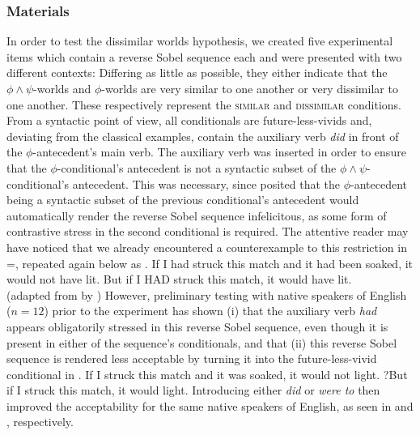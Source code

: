 \subsubsection{Materials}
In order to test the dissimilar worlds hypothesis, we created five experimental items which contain a reverse Sobel sequence each and were presented with two different contexts: Differing as little as possible, they either indicate that the $\phi\land\psi$-worlds and $\phi$-worlds are very similar to one another or very dissimilar to one another. These respectively represent the {\scshape similar} and {\scshape dissimilar} conditions. From a syntactic point of view, all conditionals are future-less-vivids and, deviating from the classical examples, contain the auxiliary verb \textit{did} in front of the $\phi$-antecedent's main verb. The auxiliary verb was inserted in order to ensure that the $\phi$-conditional's antecedent is not a syntactic subset of the $\phi\land\psi$-conditional's antecedent. This was necessary, since \textcite[p. 135]{Klecha2015} posited that the $\phi$-antecedent being a syntactic subset of the previous conditional's antecedent would automatically render the reverse Sobel sequence infelicitous, as some form of contrastive stress in the second conditional is required. The attentive reader may have noticed that we already encountered a counterexample to this restriction in =, repeated again below as . 
\ex{}If I had struck this match and it had been soaked, it would not have lit. But if I \MakeUppercase{had} struck this match, it would have lit.\\%
\emptyfill(adapted from \textcite[p. 106]{Stalnaker1968} by \textcite[p. 487]{Lewis2018})
\xe
However, preliminary testing with native speakers of English ($n=12$) prior to the experiment has shown (i) that the auxiliary verb \textit{had} appears obligatorily stressed in this reverse Sobel sequence, even though it is present in either of the sequence's conditionals, and that (ii) this reverse Sobel sequence is rendered less acceptable by turning it into the future-less-vivid conditional in . 
\ex{}If I struck this match and it was soaked, it would not light. ?But if I struck this match, it would light.
\xe
Introducing either \textit{did} or \textit{were to} then improved the acceptability for the same native speakers of English, as seen in  and , respectively.\\
